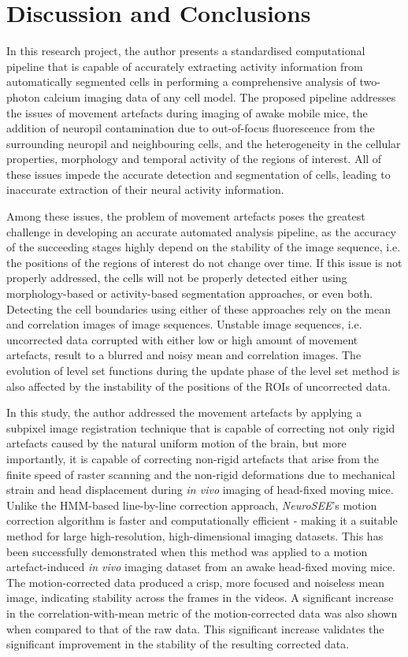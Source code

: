 \chapter{Discussion and Conclusions}

\hspace{\parindent} In this research project, the author presents a standardised computational pipeline that is capable of accurately extracting activity information from automatically segmented cells in performing a comprehensive analysis of two-photon calcium imaging data of any cell model. The proposed pipeline addresses the issues of movement artefacts during imaging of awake mobile mice, the addition of neuropil contamination due to out-of-focus fluorescence from the surrounding neuropil and neighbouring cells, and the heterogeneity in the cellular properties, morphology and temporal activity of the regions of interest. All of these issues impede the accurate detection and segmentation of cells, leading to inaccurate extraction of their neural activity information. 

Among these issues, the problem of movement artefacts poses the greatest challenge in developing an accurate automated analysis pipeline, as the accuracy of the succeeding stages highly depend on the stability of the image sequence, i.e. the positions of the regions of interest do not change over time. If this issue is not properly addressed, the cells will not be properly detected either using morphology-based or activity-based segmentation approaches, or even both. Detecting the cell boundaries using either of these approaches rely on the mean and correlation images of image sequences. Unstable image sequences, i.e. uncorrected data corrupted with either low or high amount of movement artefacts, result to a blurred and noisy mean and correlation images. The evolution of level set functions during the update phase of the level set method is also affected by the instability of the positions of the ROIs of uncorrected data. 

In this study, the author addressed the movement artefacts by applying a subpixel image registration technique that is capable of correcting not only rigid artefacts caused by the natural uniform motion of the brain, but more importantly, it is capable of correcting non-rigid artefacts that arise from the finite speed of raster scanning and the non-rigid deformations due to mechanical strain and head displacement during \textit{in vivo} imaging of head-fixed moving mice. Unlike the HMM-based line-by-line correction approach, \textit{NeuroSEE}'s motion correction algorithm is faster and computationally efficient - making it a suitable method for large high-resolution, high-dimensional imaging datasets. This has been successfully demonstrated when this method was applied to a motion artefact-induced \textit{in vivo} imaging dataset from an awake head-fixed moving mice. The motion-corrected data produced a crisp, more focused and noiseless mean image, indicating stability across the frames in the videos. A significant increase in the correlation-with-mean metric of the motion-corrected data was also shown when compared to that of the raw data. This significant increase validates the significant improvement in the stability of the resulting corrected data. 

